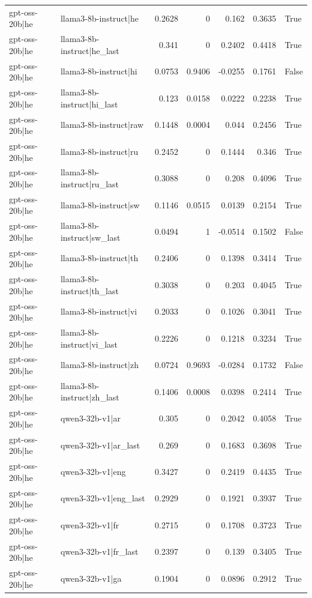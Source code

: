 \begin{table}
\begin{tabular}{l l r r r r l}
gpt-oss-20b|he & llama3-8b-instruct|he & 0.2628 & 0 & 0.162 & 0.3635 & True \\
gpt-oss-20b|he & llama3-8b-instruct|he_last & 0.341 & 0 & 0.2402 & 0.4418 & True \\
gpt-oss-20b|he & llama3-8b-instruct|hi & 0.0753 & 0.9406 & -0.0255 & 0.1761 & False \\
gpt-oss-20b|he & llama3-8b-instruct|hi_last & 0.123 & 0.0158 & 0.0222 & 0.2238 & True \\
gpt-oss-20b|he & llama3-8b-instruct|raw & 0.1448 & 0.0004 & 0.044 & 0.2456 & True \\
gpt-oss-20b|he & llama3-8b-instruct|ru & 0.2452 & 0 & 0.1444 & 0.346 & True \\
gpt-oss-20b|he & llama3-8b-instruct|ru_last & 0.3088 & 0 & 0.208 & 0.4096 & True \\
gpt-oss-20b|he & llama3-8b-instruct|sw & 0.1146 & 0.0515 & 0.0139 & 0.2154 & True \\
gpt-oss-20b|he & llama3-8b-instruct|sw_last & 0.0494 & 1 & -0.0514 & 0.1502 & False \\
gpt-oss-20b|he & llama3-8b-instruct|th & 0.2406 & 0 & 0.1398 & 0.3414 & True \\
gpt-oss-20b|he & llama3-8b-instruct|th_last & 0.3038 & 0 & 0.203 & 0.4045 & True \\
gpt-oss-20b|he & llama3-8b-instruct|vi & 0.2033 & 0 & 0.1026 & 0.3041 & True \\
gpt-oss-20b|he & llama3-8b-instruct|vi_last & 0.2226 & 0 & 0.1218 & 0.3234 & True \\
gpt-oss-20b|he & llama3-8b-instruct|zh & 0.0724 & 0.9693 & -0.0284 & 0.1732 & False \\
gpt-oss-20b|he & llama3-8b-instruct|zh_last & 0.1406 & 0.0008 & 0.0398 & 0.2414 & True \\
gpt-oss-20b|he & qwen3-32b-v1|ar & 0.305 & 0 & 0.2042 & 0.4058 & True \\
gpt-oss-20b|he & qwen3-32b-v1|ar_last & 0.269 & 0 & 0.1683 & 0.3698 & True \\
gpt-oss-20b|he & qwen3-32b-v1|eng & 0.3427 & 0 & 0.2419 & 0.4435 & True \\
gpt-oss-20b|he & qwen3-32b-v1|eng_last & 0.2929 & 0 & 0.1921 & 0.3937 & True \\
gpt-oss-20b|he & qwen3-32b-v1|fr & 0.2715 & 0 & 0.1708 & 0.3723 & True \\
gpt-oss-20b|he & qwen3-32b-v1|fr_last & 0.2397 & 0 & 0.139 & 0.3405 & True \\
gpt-oss-20b|he & qwen3-32b-v1|ga & 0.1904 & 0 & 0.0896 & 0.2912 & True \\

\end{tabular}
\end{table}
